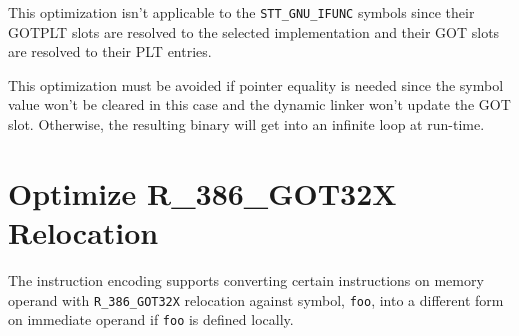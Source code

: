 This optimization isn't applicable to the \texttt{STT_GNU_IFUNC} symbols
since their GOTPLT slots are resolved to the selected implementation and
their GOT slots are resolved to their PLT entries.

This optimization must be avoided if pointer equality is needed since
the symbol value won't be cleared in this case and the dynamic linker
won't update the GOT slot.  Otherwise, the resulting binary will get
into an infinite loop at run-time.

\section{Optimize R_386_GOT32X Relocation}
\label{opt_got32x}

The \xARCH instruction encoding supports converting certain instructions
on memory operand with \texttt{R_386_GOT32X} relocation against symbol,
\texttt{foo}, into a different form on immediate operand if \texttt{foo}
is defined locally.

